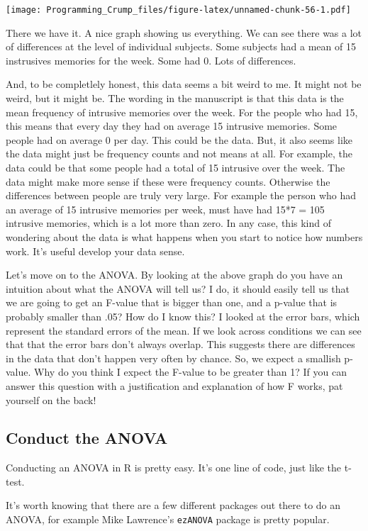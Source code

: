 \documentclass[]{book}
\theoremstyle{definition}
\theoremstyle{definition}
\theoremstyle{definition}
\theoremstyle{remark}
\begin{document}
\texttt{[image: Programming\_Crump\_files/figure-latex/unnamed-chunk-56-1.pdf]}

There we have it. A nice graph showing us everything. We can see there
was a lot of differences at the level of individual subjects. Some
subjects had a mean of 15 instrusives memories for the week. Some had 0.
Lots of differences.

And, to be completlely honest, this data seems a bit weird to me. It
might not be weird, but it might be. The wording in the manuscript is
that this data is the mean frequency of intrusive memories over the
week. For the people who had 15, this means that every day they had on
average 15 intrusive memories. Some people had on average 0 per day.
This could be the data. But, it also seems like the data might just be
frequency counts and not means at all. For example, the data could be
that some people had a total of 15 intrusive over the week. The data
might make more sense if these were frequency counts. Otherwise the
differences between people are truly very large. For example the person
who had an average of 15 intrusive memories per week, must have had 15*7
= 105 intrusive memories, which is a lot more than zero. In any case,
this kind of wondering about the data is what happens when you start to
notice how numbers work. It's useful develop your data sense.

Let's move on to the ANOVA. By looking at the above graph do you have an
intuition about what the ANOVA will tell us? I do, it should easily tell
us that we are going to get an F-value that is bigger than one, and a
p-value that is probably smaller than .05? How do I know this? I looked
at the error bars, which represent the standard errors of the mean. If
we look across conditions we can see that that the error bars don't
always overlap. This suggests there are differences in the data that
don't happen very often by chance. So, we expect a smallish p-value. Why
do you think I expect the F-value to be greater than 1? If you can
answer this question with a justification and explanation of how F
works, pat yourself on the back!

\subsection{Conduct the ANOVA}\label{conduct-the-anova}

Conducting an ANOVA in R is pretty easy. It's one line of code, just
like the t-test.

It's worth knowing that there are a few different packages out there to
do an ANOVA, for example Mike Lawrence's \texttt{ezANOVA} package is
pretty popular.
\end{document}
